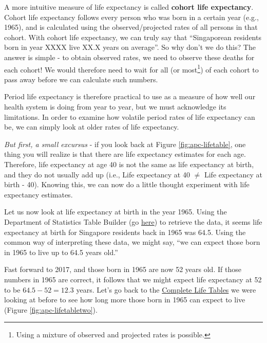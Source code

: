 \documentclass[openany]{book}
\let\rmarkdownfootnote\footnote%
\def\footnote{\protect\rmarkdownfootnote}
\begin{document}
A more intuitive measure of life expectancy is called \textbf{cohort
life expectancy}. Cohort life expectancy follows every person who was
born in a certain year (e.g., 1965), and is calculated using the
observed/projected rates of all persons in that cohort. With cohort life
expectancy, we can truly say that ``Singaporean residents born in year
XXXX live XX.X years on average''. So why don't we do this? The answer
is simple - to obtain observed rates, we need to observe these deaths
for each cohort! We would therefore need to wait for all (or
most\footnote{Using a mixture of observed and projected rates is
  possible.}) of each cohort to pass away before we can calculate such
numbers.

Period life expectancy is therefore practical to use as a measure of how
well our health system is doing from year to year, but we must
acknowledge its limitations. In order to examine how volatile period
rates of life expectancy can be, we can simply look at older rates of
life expectancy.

\emph{But first, a small excursus} - if you look back at Figure
\ref{fig:apc-lifetable}, one thing you will realize is that there are
life expectancy estimates for each age. Therefore, life expectancy at
age 40 is not the same as life expectancy at birth, and they do not
usually add up (i.e., Life expectancy at 40 \(\neq\) Life expectancy at
birth - 40). Knowing this, we can now do a little thought experiment
with life expectancy estimates.

Let us now look at life expectancy at birth in the year 1965. Using the
Department of Statistics Table Builder (go
\href{https://www.tablebuilder.singstat.gov.sg/publicfacing/createDataTable.action?refId=13276}{here})
to retrieve the data, it seems life expectancy at birth for Singapore
residents back in 1965 was 64.5. Using the common way of interpreting
these data, we might say, ``we can expect those born in 1965 to live up
to 64.5 years old.''

Fast forward to 2017, and those born in 1965 are now 52 years old. If
those numbers in 1965 are correct, it follows that we might expect life
expectancy at 52 to be \(64.5 - 52 = 12.3\) years. Let's go back to the
\href{https://www.singstat.gov.sg/-/media/files/publications/population/lifetable17-18.pdf}{Complete
Life Tables} we were looking at before to see how long more those born
in 1965 can expect to live (Figure \ref{fig:apc-lifetabletwo}).
\end{document}
